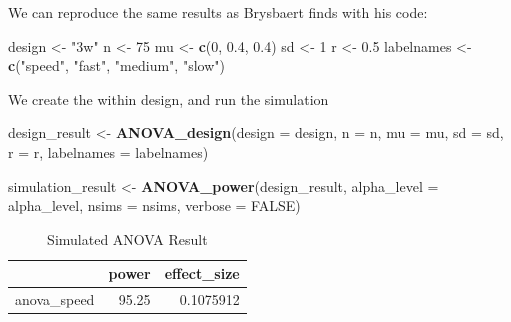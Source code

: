 \documentclass[]{book}
\newenvironment{Shaded}{\begin{snugshade}}{\end{snugshade}}
\newcommand{\DataTypeTok}[1]{\textcolor[rgb]{0.13,0.29,0.53}{#1}}
\newcommand{\DecValTok}[1]{\textcolor[rgb]{0.00,0.00,0.81}{#1}}
\newcommand{\FloatTok}[1]{\textcolor[rgb]{0.00,0.00,0.81}{#1}}
\newcommand{\KeywordTok}[1]{\textcolor[rgb]{0.13,0.29,0.53}{\textbf{#1}}}
\newcommand{\NormalTok}[1]{#1}
\newcommand{\OtherTok}[1]{\textcolor[rgb]{0.56,0.35,0.01}{#1}}
\newcommand{\StringTok}[1]{\textcolor[rgb]{0.31,0.60,0.02}{#1}}
\begin{document}
We can reproduce the same results as Brysbaert finds with his code:

\begin{Shaded}
\begin{Highlighting}[]
\NormalTok{design <-}\StringTok{ "3w"}
\NormalTok{n <-}\StringTok{ }\DecValTok{75}
\NormalTok{mu <-}\StringTok{ }\KeywordTok{c}\NormalTok{(}\DecValTok{0}\NormalTok{, }\FloatTok{0.4}\NormalTok{, }\FloatTok{0.4}\NormalTok{)}
\NormalTok{sd <-}\StringTok{ }\DecValTok{1}
\NormalTok{r <-}\StringTok{ }\FloatTok{0.5}
\NormalTok{labelnames <-}\StringTok{ }\KeywordTok{c}\NormalTok{(}\StringTok{"speed"}\NormalTok{, }\StringTok{"fast"}\NormalTok{, }\StringTok{"medium"}\NormalTok{, }\StringTok{"slow"}\NormalTok{)}
\end{Highlighting}
\end{Shaded}

We create the within design, and run the simulation

\begin{Shaded}
\begin{Highlighting}[]
\NormalTok{design_result <-}\StringTok{ }\KeywordTok{ANOVA_design}\NormalTok{(}\DataTypeTok{design =}\NormalTok{ design,}
                   \DataTypeTok{n =}\NormalTok{ n, }
                   \DataTypeTok{mu =}\NormalTok{ mu, }
                   \DataTypeTok{sd =}\NormalTok{ sd, }
                   \DataTypeTok{r =}\NormalTok{ r, }
                   \DataTypeTok{labelnames =}\NormalTok{ labelnames)}
\end{Highlighting}
\end{Shaded}

\begin{Shaded}
\begin{Highlighting}[]
\NormalTok{simulation_result <-}\StringTok{ }\KeywordTok{ANOVA_power}\NormalTok{(design_result, }
                                 \DataTypeTok{alpha_level =}\NormalTok{ alpha_level, }
                                 \DataTypeTok{nsims =}\NormalTok{ nsims,}
                                 \DataTypeTok{verbose =} \OtherTok{FALSE}\NormalTok{)}
\end{Highlighting}
\end{Shaded}

\begin{table}[t]

\caption{\label{tab:unnamed-chunk-119}Simulated ANOVA Result}
\centering
\begin{tabular}{l|r|r}
\hline
  & power & effect\_size\\
\hline
anova\_speed & 95.25 & 0.1075912\\
\hline
\end{tabular}
\end{table}
\end{document}
